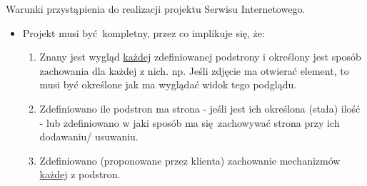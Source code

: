 \documentclass[11pt,a4paper]{scrartcl}
\title{}
\subtitle{version 0.1.0}
\author{\href{mailto:dmilith@verknowsys.com}{Daniel (dmilith) Dettlaff}}
\date{2012-12-17}
\begin{document}
\maketitle

Warunki przystąpienia do realizacji projektu Serwisu Internetowego.

\begin{itemize}

  \item Projekt musi być kompletny, przez co implikuje się, że:
  \begin{enumerate}
    \item Znany jest wygląd \underline{każdej} zdefiniowanej podstrony i określony jest sposób zachowania dla każdej z nich. np. Jeśli zdjęcie ma otwierać element, to musi być określone jak ma wyglądać widok tego podglądu.
    \item Zdefiniowano ile podstron ma strona - jeśli jest ich określona (stała) ilość - lub zdefiniowano w jaki sposób ma się zachowywać strona przy ich dodawaniu/ usuwaniu.
    \item Zdefiniowano (proponowane przez klienta) zachowanie mechanizmów \underline{każdej} z podstron.
  \end{enumerate}

\end{itemize}
\end{document}
